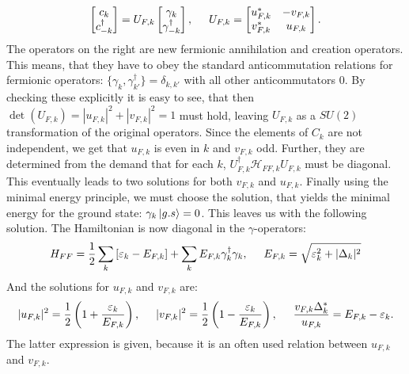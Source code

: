 \begin{equation}
 \begin{bmatrix} c_k \\ c_{-k}^\dagger \end{bmatrix} = U_{F,k} \begin{bmatrix} \gamma_k \\ \gamma^\dagger_{-k} \end{bmatrix}, \hspace{0.5cm} U_{F,k} = \begin{bmatrix} u^*_{F,k} & -v_{F,k} \\ v^*_{F,k} & u_{F,k} \end{bmatrix}. 
 \label{eq.fermionquasiparticledef}
\end{equation}
The operators on the right are new fermionic annihilation and creation operators. This means, that they have to obey the standard anticommutation relations for fermionic operators: $\{\gamma_k,\gamma_{k'}^\dagger \} = \delta_{k,k'}$ with all other anticommutators 0. By checking these explicitly it is easy to see, that then $\det(U_{F,k}) = |u_{F,k}|^2+|v_{F,k}|^2 = 1$ must hold, leaving $U_{F,k}$ as a $SU(2)$ transformation of the original operators. Since the elements of $C_k$ are not independent, we get that $u_{F,k}$ is even in $k$ and $v_{F,k}$ odd. Further, they are determined from the demand that for each $k$, $U^\dagger_{F,k} \mathcal{H}_{FF,k}U_{F,k}$ must be diagonal. This eventually leads to two solutions for both $v_{F,k}$ and $u_{F,k}$. Finally using the minimal energy principle, we must choose the solution, that yields the minimal energy for the ground state: $\gamma_k\ket{g.s} = 0$. This leaves us with the following solution. The Hamiltonian is now diagonal in the $\gamma$-operators: 
\begin{equation}
H_{FF} = \frac{1}{2}\sum_k \left[\varepsilon_k-E_{F,k}\right] + \sum_k E_{F,k} \gamma^\dagger_k \gamma_k, \hspace{0.5cm} E_{F,k} = \sqrt{\varepsilon_k^2 + |\Delta_k|^2}
\label{eq.Kitaev.H_diagonalpre}
\end{equation}
And the solutions for $u_{F,k}$ and $v_{F,k}$ are: 
\begin{equation}
|u_{F,k}|^2 = \frac{1}{2}\left(1 + \frac{\varepsilon_k}{E_{F,k}}\right), \hspace{0.5cm} |v_{F,k}|^2 = \frac{1}{2}\left(1-\frac{\varepsilon_k}{E_{F,k}}\right), \hspace{0.5cm} \frac{v_{F,k}\Delta^*_k}{u_{F,k}}=E_{F,k}-\varepsilon_k.
\label{eq.Kitaev.uk_vk}
\end{equation}
The latter expression is given, because it is an often used relation between $u_{F,k}$ and $v_{F,k}$. 

